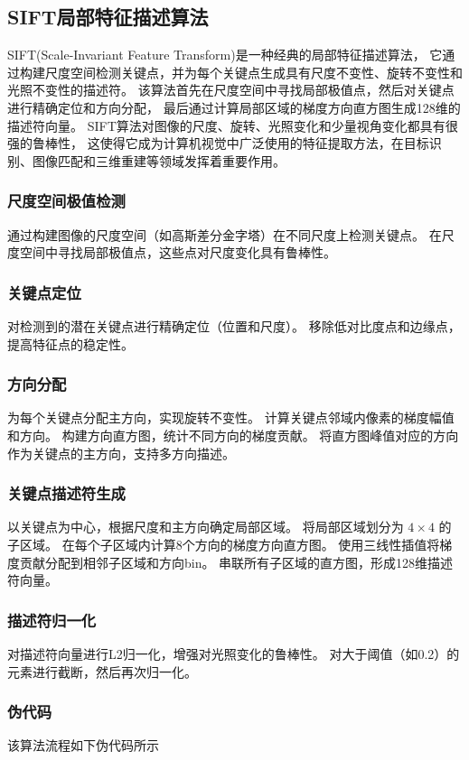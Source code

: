 \subsection{SIFT局部特征描述算法}
SIFT(Scale-Invariant Feature Transform)是一种经典的局部特征描述算法，
它通过构建尺度空间检测关键点，并为每个关键点生成具有尺度不变性、旋转不变性和光照不变性的描述符。
该算法首先在尺度空间中寻找局部极值点，然后对关键点进行精确定位和方向分配，
最后通过计算局部区域的梯度方向直方图生成128维的描述符向量。
SIFT算法对图像的尺度、旋转、光照变化和少量视角变化都具有很强的鲁棒性，
这使得它成为计算机视觉中广泛使用的特征提取方法，在目标识别、图像匹配和三维重建等领域发挥着重要作用。

\subsubsection{尺度空间极值检测}
通过构建图像的尺度空间（如高斯差分金字塔）在不同尺度上检测关键点。
在尺度空间中寻找局部极值点，这些点对尺度变化具有鲁棒性。

\subsubsection{关键点定位}
对检测到的潜在关键点进行精确定位（位置和尺度）。
移除低对比度点和边缘点，提高特征点的稳定性。

\subsubsection{方向分配}
为每个关键点分配主方向，实现旋转不变性。
计算关键点邻域内像素的梯度幅值和方向。
构建方向直方图，统计不同方向的梯度贡献。
将直方图峰值对应的方向作为关键点的主方向，支持多方向描述。

\subsubsection{关键点描述符生成}
以关键点为中心，根据尺度和主方向确定局部区域。
将局部区域划分为 \(4 \times 4\) 的子区域。
在每个子区域内计算8个方向的梯度方向直方图。
使用三线性插值将梯度贡献分配到相邻子区域和方向bin。
串联所有子区域的直方图，形成128维描述符向量。

\subsubsection{描述符归一化}
对描述符向量进行L2归一化，增强对光照变化的鲁棒性。
对大于阈值（如0.2）的元素进行截断，然后再次归一化。

\subsubsection{伪代码}
该算法流程如下伪代码所示
